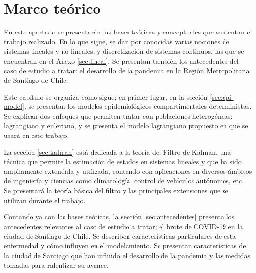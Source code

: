 \chapter{Marco teórico}\label{chap:marco}



En este apartado se presentarán las bases teóricas y conceptuales que sustentan el trabajo realizado. En lo que sigue, se dan por conocidas varias nociones de sistemas lineales y no lineales, y discretización de sistemas continuos, las que se encuentran en el Anexo \ref{sec:lineal}. Se presentan también los antecedentes del caso de estudio a tratar: el desarrollo de la pandemia en la Región Metropolitana de Santiago de Chile.

Este capítulo se organiza como sigue; en primer lugar, en la sección \ref{sec:epi-model}, se presentan los modelos epidemiológicos compartimentales deterministas. Se explican dos enfoques que permiten tratar con poblaciones heterogéneas: lagrangiano y euleriano, y se presenta el modelo lagrangiano propuesto en \cite{Bichara2018} que se usará en este trabajo.


La sección \ref{sec:kalman} está dedicada a la teoría del Filtro de Kalman, una técnica que permite la estimación de estados en sistemas lineales y que ha sido ampliamente extendida y utilizada, contando con aplicaciones en diversos ámbitos de ingeniería y ciencias como climatología, control de vehículos autónomos, etc. Se presentará la teoría básica del filtro y las principales extensiones que se utilizan durante el trabajo.

Contando ya con las bases teóricas, la sección \ref{sec:antecedentes} presenta los antecedentes relevantes al caso de estudio a tratar; el brote de COVID-19 en la ciudad de Santiago de Chile. Se describen características particulares de esta enfermedad y cómo influyen en el modelamiento. Se presentan características de la ciudad de Santiago que han influido el desarrollo de la pandemia y las medidas tomadas para ralentizar su avance.


